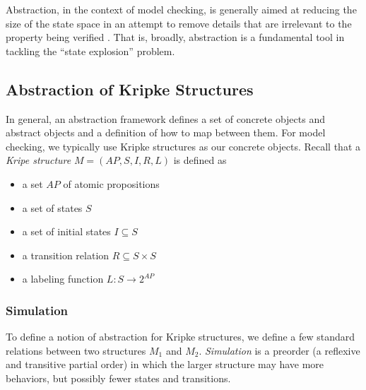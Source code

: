 \documentclass[10pt,a4paper]{article}
\begin{document}
Abstraction, in the context of model checking, is generally aimed at reducing the size of the state space in an attempt to remove details that are irrelevant to the property being verified \cite{Dams2018}. That is, broadly, abstraction is a fundamental tool in tackling the ``state explosion'' problem.


\subsection*{Abstraction of Kripke Structures}

In general, an abstraction framework defines a set of concrete objects and abstract objects and a definition of how to map between them. For model checking, we typically use Kripke structures as our concrete objects. Recall that a \textit{Kripe structure} $M=(AP,S,I,R,L)$ is defined as
\begin{itemize}
    \item a set $AP$ of atomic propositions
    \item a set of states $S$
    \item a set of initial states $I \subseteq S$
    \item a transition relation $R \subseteq S \times S$
    \item a labeling function $L : S \rightarrow 2^{AP}$
\end{itemize}

\subsubsection*{Simulation}
To define a notion of abstraction for Kripke structures, we define a few standard relations between two structures $M_1$ and $M_2$. \textit{Simulation} is a preorder (a reflexive and transitive partial order) in which the larger structure may have more behaviors, but possibly fewer states and transitions.
\end{document}
